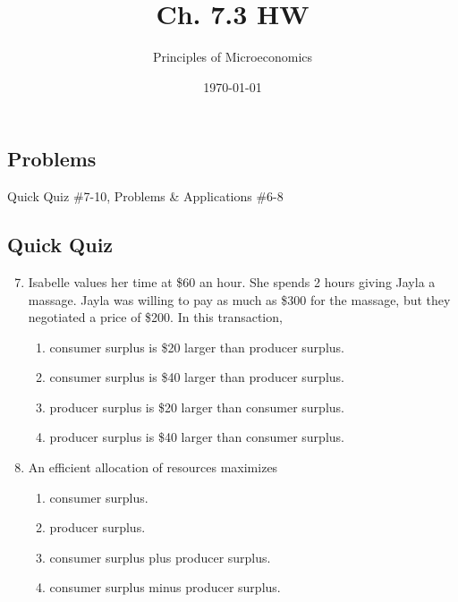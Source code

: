 \documentclass{article}
\title{Ch. 7.3 HW}
\author{Principles of Microeconomics}
\date{\today}
\begin{document}
\maketitle

\subsection*{Problems}
Quick Quiz \#7-10, Problems \& Applications \#6-8

\subsection*{Quick Quiz}

\begin{enumerate}
\setcounter{enumi}{6}

\item Isabelle values her time at \$60 an hour. She spends 2 hours giving Jayla a massage. Jayla was willing to pay as much as \$300 for the massage, but they negotiated a price of \$200. In this transaction,

	\begin{enumerate}
	
	\item consumer surplus is \$20 larger than producer surplus.
	
	\item consumer surplus is \$40 larger than producer surplus.
	
	\item producer surplus is \$20 larger than consumer surplus.
	
	\item producer surplus is \$40 larger than consumer surplus.
	
	\end{enumerate}
	
\item An efficient allocation of resources maximizes

	\begin{enumerate}
	
	\item consumer surplus.
	
	\item producer surplus.
	
	\item consumer surplus plus producer surplus.
	
	\item consumer surplus minus producer surplus.
	

\end{enumerate}
\end{enumerate}
\end{document}
